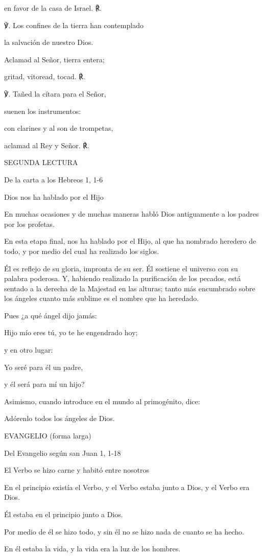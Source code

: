 \begin{body}
\begin{body}
en favor de la casa de Israel. ℟.

℣. Los confines de la tierra han contemplado

la salvación de nuestro Dios.

Aclamad al Señor, tierra entera;

gritad, vitoread, tocad. ℟.

℣. Tañed la cítara para el Señor,

suenen los instrumentos:

con clarines y al son de trompetas,

aclamad al Rey y Señor. ℟.

SEGUNDA LECTURA

De la carta a los Hebreos 1, 1-6

Dios nos ha hablado por el Hijo

En muchas ocasiones y de muchas maneras habló Dios antiguamente a los
padres por los profetas.

En esta etapa final, nos ha hablado por el Hijo, al que ha nombrado
heredero de todo, y por medio del cual ha realizado los siglos.

Él es reflejo de su gloria, impronta de su ser. Él sostiene el universo
con su palabra poderosa. Y, habiendo realizado la purificación de los
pecados, está sentado a la derecha de la Majestad en las alturas; tanto
más encumbrado sobre los ángeles cuanto más sublime es el nombre que ha
heredado.

Pues ¿a qué ángel dijo jamás:

Hijo mío eres tú, yo te he engendrado hoy;

y en otro lugar:

Yo seré para él un padre,

y él será para mí un hijo?

Asimismo, cuando introduce en el mundo al primogénito, dice:

Adórenlo todos los ángeles de Dios.

EVANGELIO (forma larga)

Del Evangelio según san Juan 1, 1-18

El Verbo se hizo carne y habitó entre nosotros

En el principio existía el Verbo, y el Verbo estaba junto a Dios, y el
Verbo era Dios.

Él estaba en el principio junto a Dios.

Por medio de él se hizo todo, y sin él no se hizo nada de cuanto se ha
hecho.

En él estaba la vida, y la vida era la luz de los hombres.


\end{body}
\end{body}
